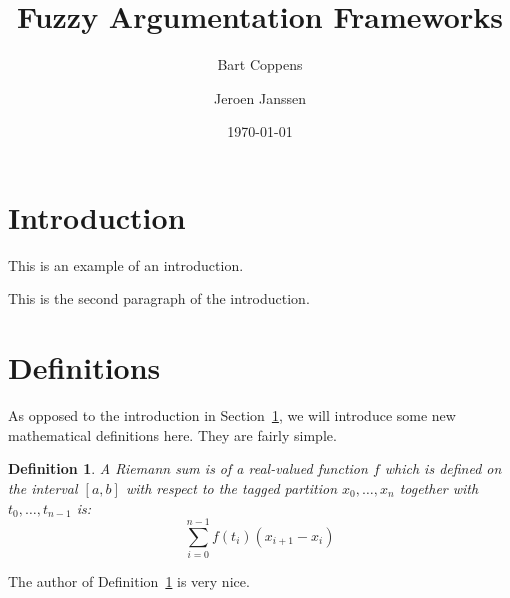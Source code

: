 \documentclass[12pt,a4paper]{article}
\begin{document}
\title{Fuzzy Argumentation Frameworks}
\date{\today}
\author{Bart Coppens \and Jeroen Janssen}
\maketitle

\newtheorem{definition}{Definition}

\section{Introduction}
\label{sec-intro}
This is an example of an introduction.

This is the second paragraph of the introduction.

\section{Definitions}
\label{sec-definitions}
As opposed to the introduction in Section~\ref{sec-intro}, we will introduce some new mathematical definitions here. They are fairly simple.

\begin{definition}\label{def-riemannsum}
A Riemann sum is of a real-valued function $f$ which is defined on the interval $[a,b]$ with respect to the tagged partition $x_0,\ldots,x_n$ together with $t_0,\ldots,t_{n-1}$ is:
$$\sum_{i=0}^{n-1} f(t_i) (x_{i+1}-x_i)$$
\end{definition}

The author of Definition~\ref{def-riemannsum} is very nice.
\end{document}
